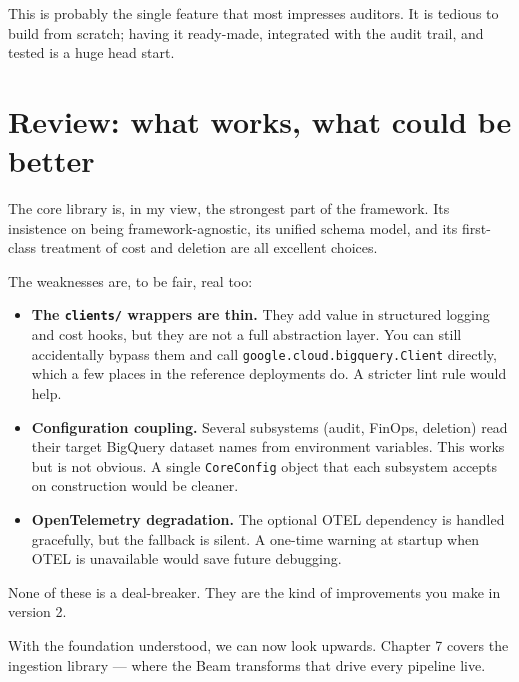 \documentclass[
  11pt,
  british,
  oneside]{book}
\providecommand{\tightlist}{%
  \setlength{\itemsep}{0pt}\setlength{\parskip}{0pt}}
\begin{document}
This is probably the single feature that most impresses auditors. It is
tedious to build from scratch; having it ready-made, integrated with the
audit trail, and tested is a huge head start.

\hypertarget{review-what-works-what-could-be-better}{%
\section{Review: what works, what could be
better}\label{review-what-works-what-could-be-better}}

The core library is, in my view, the strongest part of the framework.
Its insistence on being framework-agnostic, its unified schema model,
and its first-class treatment of cost and deletion are all excellent
choices.

The weaknesses are, to be fair, real too:

\begin{itemize}
\tightlist
\item
  \textbf{The \texttt{clients/} wrappers are thin.} They add value in
  structured logging and cost hooks, but they are not a full abstraction
  layer. You can still accidentally bypass them and call
  \texttt{google.cloud.bigquery.Client} directly, which a few places in
  the reference deployments do. A stricter lint rule would help.
\item
  \textbf{Configuration coupling.} Several subsystems (audit, FinOps,
  deletion) read their target BigQuery dataset names from environment
  variables. This works but is not obvious. A single \texttt{CoreConfig}
  object that each subsystem accepts on construction would be cleaner.
\item
  \textbf{OpenTelemetry degradation.} The optional OTEL dependency is
  handled gracefully, but the fallback is silent. A one-time warning at
  startup when OTEL is unavailable would save future debugging.
\end{itemize}

None of these is a deal-breaker. They are the kind of improvements you
make in version 2.

With the foundation understood, we can now look upwards. Chapter 7
covers the ingestion library --- where the Beam transforms that drive
every pipeline live.
\end{document}
